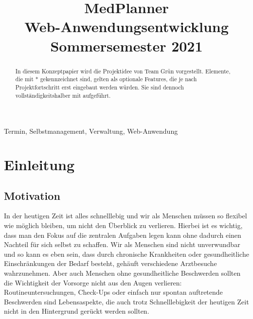 \documentclass[conference]{IEEEtran}
\begin{document}
\title{MedPlanner\\
{\large Web-Anwendungsentwicklung Sommersemester 2021}
}

\author{
\and
{}
\and
{}
\and
{}
\and
{}
}

\maketitle

\begin{abstract}
In diesem Konzeptpapier wird die Projektidee von Team Grün vorgestellt. Elemente, die mit * gekennzeichnet sind, gelten als optionale Features, die je nach Projektfortschritt erst eingebaut werden würden. Sie sind dennoch vollständigkeitshalber mit aufgeführt.
\end{abstract}

\begin{IEEEkeywords}
Termin, Selbstmanagement, Verwaltung, Web-Anwendung
\end{IEEEkeywords}

\section{Einleitung}
\subsection{Motivation}
In der heutigen Zeit ist alles schnelllebig und wir als Menschen müssen so flexibel wie möglich bleiben, um nicht den Überblick zu verlieren. 
Hierbei ist es wichtig, dass man den Fokus auf die zentralen Aufgaben legen kann ohne dadurch einen Nachteil für sich selbst zu schaffen.
Wir als Menschen sind nicht unverwundbar und so kann es eben sein, dass durch chronische Krankheiten oder gesundheitliche Einschränkungen der Bedarf besteht, gehäuft verschiedene Arztbesuche wahrzunehmen.
Aber auch Menschen ohne gesundheitliche Beschwerden sollten die Wichtigkeit der Vorsorge nicht aus den Augen verlieren:
Routineuntersuchungen, Check-Ups oder einfach nur spontan auftretende Beschwerden sind Lebensaspekte, die auch trotz Schnelllebigkeit der heutigen Zeit nicht in den Hintergrund gerückt werden sollten.
\end{document}
